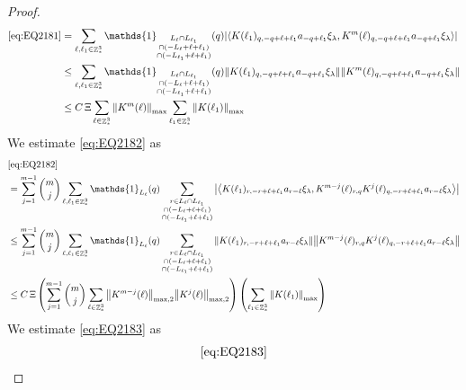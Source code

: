 \documentclass[12pt,a4paper]{article}
\numberwithin{equation}{section}
\newcommand{\1}{\mathbb{I}}
\DeclareMathOperator{\Z}{\mathbb{Z}}
\newcommand{\eva}[1]{\left\langle #1 \right\rangle}
\theoremstyle{plain}
\theoremstyle{definition}
\theoremstyle{remark}
\theoremstyle{plain}
\theoremstyle{definition}
\theoremstyle{remark}
\begin{document}
\begin{proof}
\begin{align}
	 \eqref{eq:EQ2181}
	&= \sum\limits_{\ell, \ell_1\in \Z^3_*} \mathds{1}_{\substack{L_{\ell}\cap L_{\ell_1}\\\cap (-L_{\ell}+\ell+\ell_1) \\ \cap (-L_{\ell_1}+\ell+\ell_1)}}(q) \abs{\eva{ K(\ell_1)_{q,-q+\ell+\ell_1} a_{-q+\ell_1} \xi_\lambda, K^m(\ell)_{q,-q+\ell+\ell_1} a_{-q+\ell_1} \xi_\lambda }}\nonumber\\
	&\leq \sum\limits_{\ell, \ell_1\in \Z^3_*} \mathds{1}_{\substack{L_{\ell}\cap L_{\ell_1}\\\cap (-L_{\ell}+\ell+\ell_1) \\ \cap (-L_{\ell_1}+\ell+\ell_1)}}(q) \norm{ K(\ell_1)_{q,-q+\ell+\ell_1} a_{-q+\ell_1} \xi_\lambda}\norm{ K^m(\ell)_{q,-q+\ell+\ell_1} a_{-q+\ell_1} \xi_\lambda }\nonumber\\
	&\leq C\,\Xi \sum\limits_{\ell \in \Z^3_*} \norm{K^m(\ell)}_{\max} \sum\limits_{\ell_1 \in \Z^3_*} \norm{K(\ell_1)}_{\max}   \label{eq:estEQ2181}
\end{align}
We estimate \eqref{eq:EQ2182} as
\begin{align}
	& \eqref{eq:EQ2182}\nonumber\\
	&= \sum\limits_{j=1}^{m-1} {{m}\choose j} \sum\limits_{\ell, \ell_1\in \Z^3_*}\mathds{1}_{L_{\ell}}(q) \sum\limits_{\substack{r\in L_{\ell} \cap L_{\ell_1}\\\cap (-L_{\ell}+\ell+\ell_1) \\ \cap (-L_{\ell_1}+\ell+\ell_1)}}  \abs{\eva{ K(\ell_1)_{r,-r+\ell+\ell_1} a_{r-\ell} \xi_\lambda, K^{m-j}(\ell)_{r,q} K^j(\ell)_{q,-r+\ell+\ell_1} a_{r-\ell} \xi_\lambda }}\nonumber\\
	&\leq \sum\limits_{j=1}^{m-1} {{m}\choose j} \sum\limits_{\ell, \ell_1\in \Z^3_*}\mathds{1}_{L_{\ell}}(q) \sum\limits_{\substack{r\in L_{\ell} \cap L_{\ell_1}\\\cap (-L_{\ell}+\ell+\ell_1) \\ \cap (-L_{\ell_1}+\ell+\ell_1)}}  \norm{ K(\ell_1)_{r,-r+\ell+\ell_1} a_{r-\ell} \xi_\lambda} \norm{ K^{m-j}(\ell)_{r,q} K^j(\ell)_{q,-r+\ell+\ell_1} a_{r-\ell} \xi_\lambda} \nonumber\\
	&\leq C\,\Xi \left(\sum\limits_{j=1}^{m-1} {{m}\choose j} \sum\limits_{ \ell\in \Z^3_*} \norm{K^{m-j}(\ell)}_{\mathrm{max,2}} \norm{K^j(\ell)}_{\mathrm{max,2}}\right) \left(\sum\limits_{ \ell_1\in \Z^3_*}\norm{ K(\ell_1)}_{\max} \right) \label{eq:estEQ2182}
\end{align}
We estimate \eqref{eq:EQ2183} as
\begin{align}
	& \eqref{eq:EQ2183}\nonumber\\

\end{align}
\end{proof}
\end{document}
